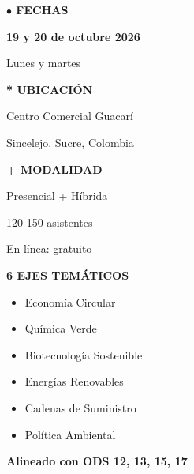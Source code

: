 \documentclass[12pt,a4paper]{article}
\begin{document}

\noindent
\begin{minipage}[t]{0.48\textwidth}
  \textcolor{verdeosc}{\textbf{$\bullet$ FECHAS}}

  \vspace{0.15cm}

  \textcolor{verdemid}{\textbf{19 y 20 de octubre 2026}}

  Lunes y martes

  \vspace{0.3cm}

  \textcolor{verdeosc}{\textbf{* UBICACIÓN}}

  \vspace{0.15cm}

  Centro Comercial Guacarí

  Sincelejo, Sucre, Colombia

  \vspace{0.3cm}

  \textcolor{verdeosc}{\textbf{+ MODALIDAD}}

  \vspace{0.15cm}

  Presencial + Híbrida

  120-150 asistentes

  En línea: gratuito
\end{minipage}
\hfill
\begin{minipage}[t]{0.48\textwidth}
  \textcolor{verdeosc}{\textbf{6 EJES TEMÁTICOS}}

  \vspace{0.15cm}

  {\small
  \begin{itemize}
    \setlength{\itemsep}{0.05cm}
    \setlength{\parskip}{0pt}
    \item Economía Circular
    \item Química Verde
    \item Biotecnología Sostenible
    \item Energías Renovables
    \item Cadenas de Suministro
    \item Política Ambiental
  \end{itemize}
  }

  \vspace{0.2cm}

  \textcolor{dorado}{\textbf{Alineado con ODS 12, 13, 15, 17}}
\end{minipage}
\end{document}
